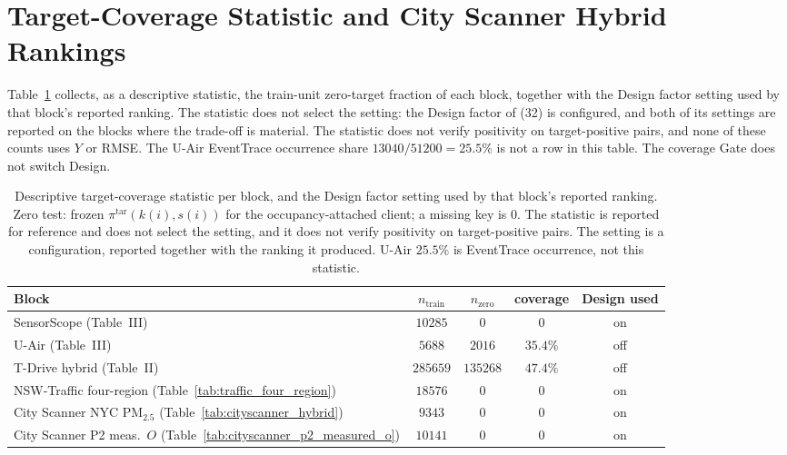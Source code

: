 \section{Target-Coverage Statistic and City Scanner Hybrid Rankings}
\label{app:cityscanner_phi}

Table~\ref{tab:scd_phi_freeze} collects, as a descriptive statistic, the
train-unit zero-target fraction of each block, together with the Design
factor setting used by that block's reported ranking.
The statistic does not select the setting: the Design factor of
(32) is configured, and both of its settings are reported
on the blocks where the trade-off is material.
The statistic does not verify positivity on
target-positive pairs, and none of these counts uses $Y$ or RMSE.
The U-Air EventTrace occurrence share
$13040/51200=25.5\%$ is not a row in this table.
The coverage Gate does not switch Design.

\begin{table}[t]
\centering
\caption{Descriptive target-coverage statistic per block, and the Design
factor setting used by that block's reported ranking.
Zero test: frozen $\pi^{\mathrm{tar}}(k(i),s(i))$ for the occupancy-attached
client; a missing key is $0$.
The statistic is reported for reference and does not select the setting,
and it does not verify positivity on target-positive pairs.
The setting is a configuration, reported together with the ranking it
produced.
U-Air $25.5\%$ is EventTrace occurrence, not this statistic.}
\label{tab:scd_phi_freeze}
\scriptsize
\setlength{\tabcolsep}{3pt}
\begin{tabular*}{\columnwidth}{@{\extracolsep{\fill}}lcccc}
\toprule
Block & $n_{\mathrm{train}}$ & $n_{\mathrm{zero}}$ & coverage & Design used\\
\midrule
SensorScope (Table~III) & $10285$ & $0$ & $0$ & on\\
U-Air (Table~III) & $5688$ & $2016$ & $35.4\%$ & off\\
T-Drive hybrid (Table~II) & $285659$ & $135268$ & $47.4\%$ & off\\
NSW-Traffic four-region (Table~\ref{tab:traffic_four_region}) & $18576$ & $0$ & $0$ & on\\
City Scanner NYC {PM}$_{2.5}$ (Table~\ref{tab:cityscanner_hybrid}) & $9343$ & $0$ & $0$ & on\\
City Scanner P2 meas.\ $O$ (Table~\ref{tab:cityscanner_p2_measured_o}) & $10141$ & $0$ & $0$ & on\\
\bottomrule
\end{tabular*}
\end{table}


